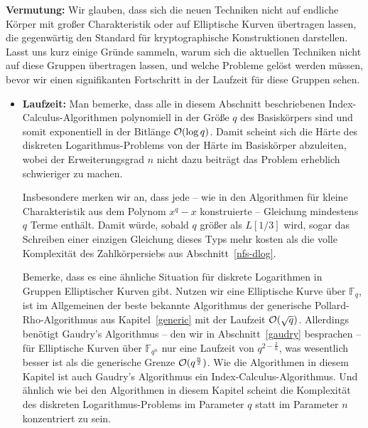 \begin{refsegment}
\noindent \textbf{Vermutung:} Wir glauben, dass sich die neuen Techniken nicht auf endliche Körper mit großer Charakteristik oder auf Elliptische Kurven übertragen lassen, die gegenwärtig den Standard für kryptographische Konstruktionen darstellen.\\[0.1cm]

Lasst uns kurz einige Gründe sammeln, warum sich die aktuellen Techniken nicht auf diese Gruppen übertragen lassen, und welche Probleme gelöst werden müssen, bevor wir einen signifikanten Fortschritt in der Laufzeit für diese Gruppen sehen.

\begin{itemize}
\item \textbf{Laufzeit:} Man bemerke, dass alle in diesem Abschnitt beschriebenen Index-Calculus-Algorithmen polynomiell in der Größe $q$ des Basiskörpers sind und somit exponentiell in der Bitlänge ${\cal O}(\log q)$. Damit scheint sich die Härte des diskreten Logarithmus-Problems von der Härte im Basiskörper abzuleiten, wobei der Erweiterungsgrad $n$ nicht dazu beiträgt das Problem erheblich schwieriger zu machen.

Insbesondere merken wir an, dass jede -- wie in den Algorithmen für kleine Charakteristik aus dem Polynom $x^q-x$ konstruierte -- Gleichung mindestens $q$ Terme enthält. Damit würde, sobald $q$ größer als $L[1/3]$ wird, sogar das Schreiben einer einzigen Gleichung dieses Typs mehr kosten als die volle Komplexität des Zahlkörpersiebs aus Abschnitt~\ref{nfs-dlog}.

Bemerke, dass es eine ähnliche Situation für diskrete Logarithmen in Gruppen Elliptischer Kurven gibt. Nutzen wir eine Elliptische Kurve über $\mathbb{F}_q$, ist im Allgemeinen der beste bekannte Algorithmus der generische Pollard-Rho-Algorithmus aus Kapitel~\ref{generic} mit der Laufzeit ${\cal O}(\sqrt q)$. Allerdings benötigt Gaudry's Algorithmus -- den wir in Abschnitt~\ref{gaudry} besprachen -- für Elliptische Kurven über $\mathbb{F}_{q^n}$ nur eine Laufzeit von $q^{2-\frac 2 n}$, was wesentlich besser ist als die generische Grenze ${\cal O}(q^{\frac n 2})$. Wie die Algorithmen in diesem Kapitel ist auch Gaudry's Algorithmus ein Index-Calculus-Algorithmus. Und ähnlich wie bei den Algorithmen in diesem Kapitel scheint die Komplexität des diskreten Logarithmus-Problems im Parameter $q$ statt im Parameter $n$ konzentriert zu sein.


\end{itemize}
\end{refsegment}
